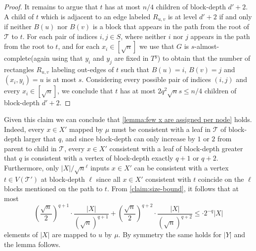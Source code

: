 \documentclass[10pt,a4paper]{article}
\theoremstyle{definition}
\theoremstyle{remark}
\theoremstyle{example}
\theoremstyle{plain}
\newcommand{\calT}{\mathcal{T}}
\newcommand{\threshold}{q}
\newcommand{\ndense}{almost-complete\xspace}
\begin{document}
{\begin{proof}
    It remains to argue that $t$ has at most ${n}/4$ children of 
    block-depth $d' + 2$. A child of $t$ which is adjacent to an edge labeled $R_{u,v}$ is at level $d' + 2$ if and only if neither $B(u)$ nor $B(v)$ is a block that appears in the path from the root of $\calT$ to $t$. For each pair of indices $i,j \in S$, where neither $i$ nor $j$ appears in the path from the root to $t$, and for each $x_i \in [\sqrt{n}]$ we use that $G$ is $s$-\ndense (again using that $y_i$ and $y_j$ are fixed in $T^y$) to obtain that the number of rectangles $R_{u,v}$ labeling out-edges of $t$ such that  $B(u) = i$, $B(v) = j$ and $(x_i,y_i) = u$ is at most 
    $s$.
% 
    Considering every possible pair of indices $(i,j)$ and every $x_i \in [\sqrt{n}]$, we conclude that $t$ has at most $2 q^2 \sqrt{n} s \leq n/4$ children of 
    block-depth $d' + 2$. 
\end{proof}
}

Given this claim we can conclude that \autoref{lemma:few x are assigned per node} holds.
Indeed, every $x\in X'$ mapped by $\mu$ must be consistent with a leaf in $\calT$ of block-depth larger that $\threshold$, and
since block-depth can only increase by $1$ or $2$ from parent to child in $\calT$, every $x\in X'$ consistent with a leaf of block-depth greater that $\threshold$ is consistent with a vertex of block-depth exactly $\threshold+1$ or $\threshold +2$. 
Furthermore, only $\lvert X \rvert/\sqrt{n}^\ell$ inputs $x\in X'$ can be consistent with a vertex $t\in V(\calT')$ at block-depth $\ell$ since all $x\in X'$ consistent with $t$ coincide on the $\ell$ blocks mentioned on the path to $t$. 
% 
From \autoref{claim:size-bound}, it follows that at most
\begin{equation*}
    \left(\frac{\sqrt{n}}{2}\right)^{\threshold +1}
    \cdot
    \frac{\lvert X\rvert}{\left(\sqrt{n}\right)^{\threshold + 1}}
    +
    \left(\frac{\sqrt{n}}{2}\right)^{\threshold+2}
    \cdot
    \frac{\lvert X\rvert}{\left(\sqrt{n}\right)^{\threshold+2}}   
    \leq \cdot2^{-\threshold}\lvert X \rvert 
\end{equation*} elements of $\lvert X\rvert $ are mapped to $u$ by $\mu$. By symmetry the same holds for $\lvert Y\rvert$ and the lemma follows.
\end{document}
